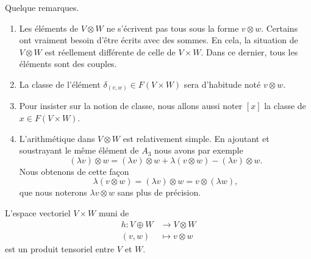 \begin{remark}      \label{REMooSLEGooWEiutz}
	Quelque remarques.
	\begin{enumerate}
		\item
		      Les éléments de \( V\otimes W\) ne s'écrivent pas tous sous la forme \( v\otimes w\). Certains ont vraiment besoin d'être écrits avec des sommes. En cela, la situation de \( V\otimes W\) est réellement différente de celle de \( V\times W\). Dans ce dernier, tous les éléments sont des couples.
		\item
		      La classe de l'élément \( \delta_{(v,w)}\in F(V\times W)\) sera d'habitude noté \( v\otimes w\).
		\item
		      Pour insister sur la notion de classe, nous allons aussi noter \( [x]\) la classe de \( x\in F(V\times W)\).
		\item       \label{ITEMooPVWHooMkgQoT}
		      L'arithmétique dans \( V\otimes W\) est relativement simple. En ajoutant et soustrayant le même élément de \( A_3\) nous avons par exemple
		      \begin{equation}
			      (\lambda v)\otimes w=(\lambda v)\otimes w+\lambda (v\otimes w)-(\lambda v)\otimes w.
		      \end{equation}
		      Nous obtenons de cette façon
		      \begin{equation}
			      \lambda(v\otimes w)=(\lambda v)\otimes w=v\otimes (\lambda w),
		      \end{equation}
		      que nous noterons \( \lambda v\otimes w\) sans plus de précision.
	\end{enumerate}
\end{remark}

\begin{proposition}     \label{PROPooIWZDooRRZNCf}
	L'espace vectoriel \( V\times W\) muni de
	\begin{equation}
		\begin{aligned}
			h\colon V\oplus W & \to V\otimes W     \\
			(v,w)             & \mapsto v\otimes w
		\end{aligned}
	\end{equation}
	est un produit tensoriel entre \( V\) et \( W\).
\end{proposition}

